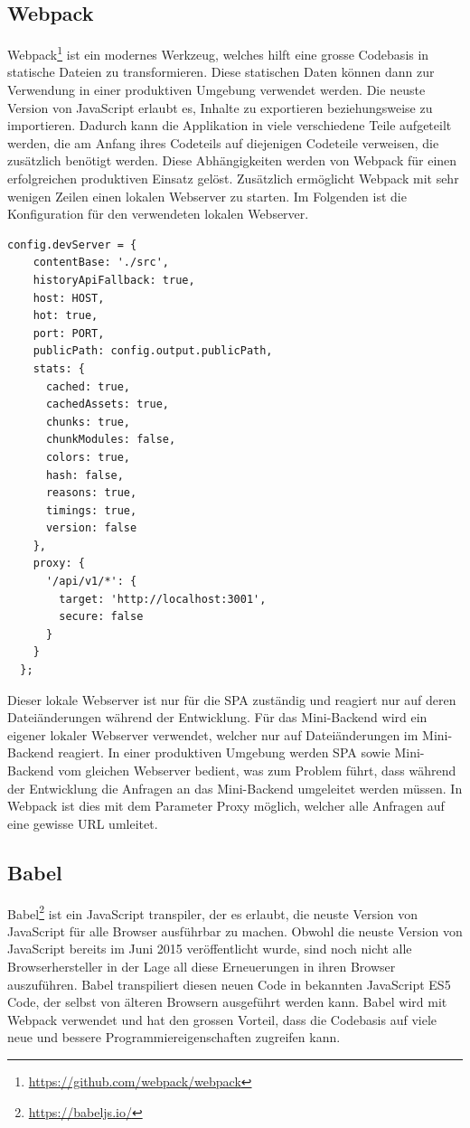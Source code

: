 \subsection{Webpack}
Webpack\footnote{\url{https://github.com/webpack/webpack}} ist ein modernes Werkzeug, welches hilft eine grosse Codebasis in statische Dateien zu transformieren. Diese statischen Daten können dann zur Verwendung in einer produktiven Umgebung verwendet werden. Die neuste Version von JavaScript erlaubt es, Inhalte zu exportieren beziehungsweise zu importieren. Dadurch kann die Applikation in viele verschiedene Teile aufgeteilt werden, die am Anfang ihres Codeteils auf diejenigen Codeteile verweisen, die zusätzlich benötigt werden. Diese Abhängigkeiten werden von Webpack für einen erfolgreichen produktiven Einsatz gelöst. Zusätzlich ermöglicht Webpack mit sehr wenigen Zeilen einen lokalen Webserver zu starten. Im Folgenden ist die Konfiguration für den verwendeten lokalen Webserver.
\begin{lstlisting}[caption=Lokaler Webserver]
  config.devServer = {
    contentBase: './src',
    historyApiFallback: true,
    host: HOST,
    hot: true,
    port: PORT,
    publicPath: config.output.publicPath,
    stats: {
      cached: true,
      cachedAssets: true,
      chunks: true,
      chunkModules: false,
      colors: true,
      hash: false,
      reasons: true,
      timings: true,
      version: false
    },
    proxy: {
      '/api/v1/*': {
        target: 'http://localhost:3001',
        secure: false
      }
    }
  };
\end{lstlisting}
Dieser lokale Webserver ist nur für die SPA zuständig und reagiert nur auf deren Dateiänderungen während der Entwicklung. Für das Mini-Backend wird ein eigener lokaler Webserver verwendet, welcher nur auf Dateiänderungen im Mini-Backend reagiert. In einer produktiven Umgebung werden SPA sowie Mini-Backend vom gleichen Webserver bedient, was zum Problem führt, dass während der Entwicklung die Anfragen an das Mini-Backend umgeleitet werden müssen. In Webpack ist dies mit dem Parameter Proxy möglich, welcher alle Anfragen auf eine gewisse URL umleitet.


\subsection{Babel}
Babel\footnote{\url{https://babeljs.io/}} ist ein JavaScript transpiler, der es erlaubt, die neuste Version von JavaScript für alle Browser ausführbar zu machen. Obwohl die neuste Version von JavaScript bereits im Juni 2015 veröffentlicht wurde, sind noch nicht alle Browserhersteller in der Lage all diese Erneuerungen in ihren Browser auszuführen. Babel transpiliert diesen neuen Code in bekannten JavaScript ES5 Code, der selbst von älteren Browsern ausgeführt werden kann. Babel wird mit Webpack verwendet und hat den grossen Vorteil, dass die Codebasis auf viele neue und bessere Programmiereigenschaften zugreifen kann.

